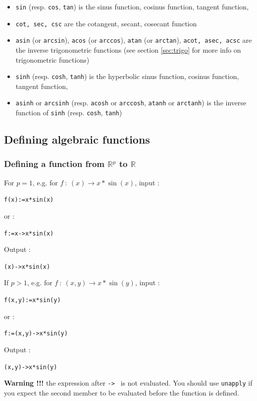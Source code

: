 \documentclass[a4paper,11pt]{book}
\begin{document}
\begin{itemize}
{\tt logb(7,10)=log10(7)=log(7)/log(10)},
\item
{\tt sin} (resp. {\tt cos},
{\tt tan})
is the sinus function, cosinus function, tangent function,
\item {\tt cot, sec, csc} are the cotangent, secant, cosecant function
\item {\tt asin} (or {\tt arcsin}),{
\tt acos} (or {\tt arccos}), 
{\tt atan} (or {\tt arctan}), 
{\tt acot, asec, acsc} are the inverse trigonometric functions (see 
section \ref{sec:trigo} for more info on trigonometric functions)
\item
{\tt sinh} (resp. {\tt cosh},
{\tt tanh})
is the hyperbolic sinus function, cosinus function, tangent function,
\item
{\tt asinh} or {\tt arcsinh} (resp. 
{\tt acosh} or {\tt arccosh}, 
{\tt atanh} or {\tt arctanh})
is the inverse function of {\tt sinh} (resp. {\tt cosh}, {\tt tanh})
\end{itemize}

\subsection{Defining algebraic functions}
\subsubsection{Defining a function from $\mathbb{R}^p$ to $\mathbb{R}$}
\noindent For $p=1$, e.g. for $f\ :\ (x)\rightarrow x*\sin(x)$, input :
\begin{center}{\tt f(x):=x*sin(x)}\end{center}
or :
\begin{center}{\tt f:=x->x*sin(x)}\end{center}
Output :
\begin{center}{\tt  (x)->x*sin(x)}\end{center}
If $p>1$, e.g. for $f\ :\ (x,y)\rightarrow x*\sin(y)$, input :
\begin{center}{\tt f(x,y):=x*sin(y)}\end{center}
or :
\begin{center}{\tt f:=(x,y)->x*sin(y)}\end{center}
Output :
\begin{center}{\tt  (x,y)->x*sin(y)}\end{center}
{\bf Warning !!!} the expression after {\tt  -> } is not evaluated.
You should use {\tt unapply} if you expect the second member to
be evaluated before the function is defined.
\end{document}
